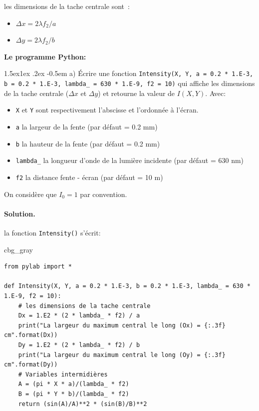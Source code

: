 \documentclass[%
oneside,                 %
final,                   %
10pt,french]{article}
\makeatletter
\newenvironment{_cod_tight}[1]{
   \def\FrameCommand{\colorbox{#1}}
   \FrameRule0.6pt\MakeFramed {\FrameRestore}\vskip3mm}
   {\vskip0mm\endMakeFramed}
\newenvironment{cod}[1]{
\bgroup\rmfamily
\fboxsep=0mm\relax
\begin{_cod_tight}{#1}
\list{}{\parsep=-2mm\parskip=0mm\topsep=0pt\leftmargin=2mm
\rightmargin=2\leftmargin\leftmargin=4pt\relax}
\item\relax}
{\endlist\end{_cod_tight}\egroup}
\newenvironment{doconceexercise}{}{}
\newcommand\subex{\@startsection{paragraph}{4}{\z@}%
                  {1.5ex\@plus1ex \@minus.2ex}%
                  {-0.5em}%
                  {\normalfont\normalsize\bfseries}}
\makeatother
\begin{document}
\begin{doconceexercise}
\vspace{6mm}



les dimensions de la tache centrale sont :
\begin{itemize}
 \item $\Delta x = 2 \lambda f_2/a $

 \item $\Delta y = 2 \lambda f_2/b $
\end{itemize}

\noindent
\textbf{Le programme Python:}


\subex{a)}
Écrire une fonction \Verb!Intensity(X, Y, a = 0.2 * 1.E-3, b = 0.2 * 1.E-3, lambda_ = 630 * 1.E-9, f2 = 10)! qui affiche les dimensions de la tache centrale ($\Delta x$ et $\Delta y$) et retourne la valeur de $I(X,Y)$. Avec:
\begin{itemize}
\item \texttt{X} et \texttt{Y} sont respectivement l'abscisse et l'ordonnée à l'écran.

\item \texttt{a} la largeur de la fente (par défaut = 0.2 mm)

\item \texttt{b} la hauteur de la fente (par défaut = 0.2 mm)

\item \Verb!lambda_! la longueur d'onde de la lumière incidente (par défaut = 630 nm)

\item \texttt{f2} la distance fente - écran (par défaut = 10 m)
\end{itemize}

\noindent
On considère que $I_0 = 1$ par convention.


\paragraph{Solution.}
la fonction \texttt{Intensity()} s'écrit:

\begin{cod}{cbg_gray}\begin{verbatim}
from pylab import *

def Intensity(X, Y, a = 0.2 * 1.E-3, b = 0.2 * 1.E-3, lambda_ = 630 * 1.E-9, f2 = 10):
    # les dimensions de la tache centrale
    Dx = 1.E2 * (2 * lambda_ * f2) / a
    print("La largeur du maximum central le long (Ox) = {:.3f} cm".format(Dx))
    Dy = 1.E2 * (2 * lambda_ * f2) / b
    print("La largeur du maximum central le long (Oy) = {:.3f} cm".format(Dy))
    # Variables intermidières
    A = (pi * X * a)/(lambda_ * f2)
    B = (pi * Y * b)/(lambda_ * f2)
    return (sin(A)/A)**2 * (sin(B)/B)**2
\end{verbatim}
\end{cod}
\noindent


\end{doconceexercise}
\end{document}
